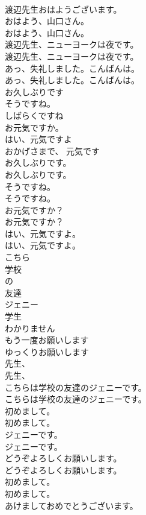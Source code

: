 \documentclass[8pt]{extreport}
\begin{document}
\begin{CJK}{UTF8}{min}
\\	渡辺先生おはようございます。 
\\	おはよう、山口さん。	
\\	おはよう、山口さん。 
\\	渡辺先生、ニューヨークは夜です。	
\\	渡辺先生、ニューヨークは夜です。 
\\	あっ、失礼しました。こんばんは。	
\\	あっ、失礼しました。こんばんは。 
\\	お久しぶりです
\\	そうですね。
\\	しばらくですね
\\	お元気ですか。
\\	はい、元気ですよ
\\	おかげさまで、 元気です
\\	お久しぶりです。	
\\	お久しぶりです。 
\\	そうですね。	
\\	そうですね。 
\\	お元気ですか？	
\\	お元気ですか？ 
\\	はい、元気ですよ。	
\\	はい、元気ですよ。 
\\	こちら
\\	学校
\\	の
\\	友達
\\	ジェニー
\\	学生
\\	わかりません
\\	もう一度お願いします
\\	ゆっくりお願いします
\\	先生、	
\\	先生、 
\\	こちらは学校の友達のジェニーです。	
\\	こちらは学校の友達のジェニーです。 
\\	初めまして。	
\\	初めまして。 
\\	ジェニーです。	
\\	ジェニーです。 
\\	どうぞよろしくお願いします。	
\\	どうぞよろしくお願いします。 
\\	初めまして。	
\\	初めまして。 
\\	あけましておめでとうございます。

\end{CJK}
\end{document}
